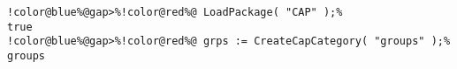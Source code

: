 \begin{Verbatim}[commandchars=!@\%,frame=single]
!color@blue%@gap>%!color@red%@ LoadPackage( "CAP" );%
true
!color@blue%@gap>%!color@red%@ grps := CreateCapCategory( "groups" );%
groups
\end{Verbatim}
